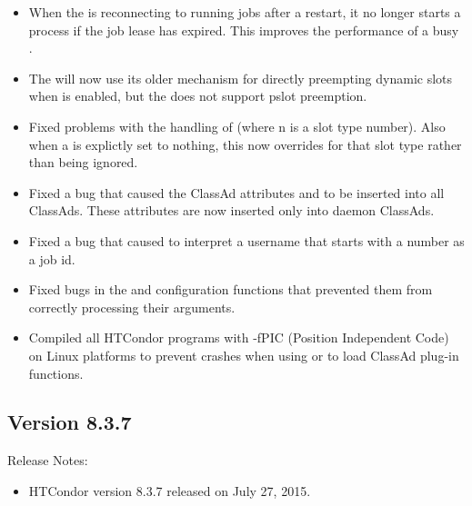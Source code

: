 \begin{itemize}
\item When the  is reconnecting to running jobs after
a restart, 
it no longer starts a  process if the job lease has expired.
This improves the performance of a busy .

\item The  will now use its older mechanism for directly
preempting dynamic slots when  is enabled,
but the  does not support pslot preemption.

\item Fixed problems with the handling of 
(where n is a slot type number). Also when a  is explictly set
to nothing, this now overrides  for that slot type rather than being ignored.

\item Fixed a bug that caused the ClassAd attributes  and 
to be inserted into all ClassAds.  These attributes are now inserted only into daemon ClassAds.

\item Fixed a bug that caused  to interpret a username that starts with a number as a job id.

\item Fixed bugs in the  and  configuration functions
that prevented them from correctly processing their arguments.

\item Compiled all HTCondor programs with -fPIC (Position Independent Code)
on Linux platforms to prevent crashes when using 
or  to load ClassAd plug-in functions.

\end{itemize}

\subsection*{\label{sec:New-8-3-7}Version 8.3.7}

\noindent Release Notes:

\begin{itemize}

\item HTCondor version 8.3.7 released on July 27, 2015.

\end{itemize}


